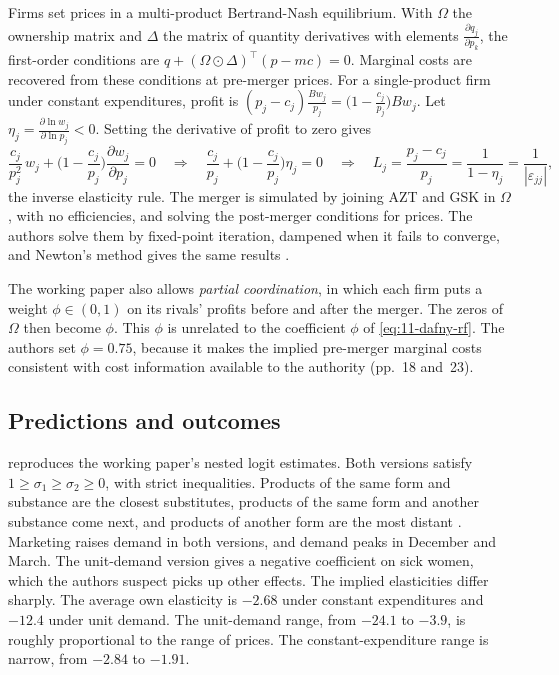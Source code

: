  Firms set prices in a multi-product Bertrand-Nash equilibrium. With $\Omega$ the
ownership matrix and $\Delta$ the matrix of quantity derivatives with elements $\frac{\partial q_j}{\partial p_k}$,
the first-order conditions are $q+(\Omega\odot\Delta)^{\top}(p-mc)=0$. Marginal costs are recovered from these
conditions at pre-merger prices. For a single-product firm under constant expenditures, profit is
$(p_j-c_j)\frac{Bw_j}{p_j}=\big(1-\frac{c_j}{p_j}\big)Bw_j$. Let $\eta_j=\frac{\partial\ln w_j}{\partial\ln
p_j}<0$. Setting the derivative of profit to zero gives
\begin{equation*}
\frac{c_j}{p_j^2}\,w_j+\Big(1-\frac{c_j}{p_j}\Big)\frac{\partial w_j}{\partial p_j}=0
\quad\Longrightarrow\quad
\frac{c_j}{p_j}+\Big(1-\frac{c_j}{p_j}\Big)\eta_j=0
\quad\Longrightarrow\quad
L_j=\frac{p_j-c_j}{p_j}=\frac{1}{1-\eta_j}=\frac{1}{|\varepsilon_{jj}|},
\end{equation*}
the inverse elasticity rule. The merger is simulated by joining AZT and GSK in $\Omega$, with no efficiencies, and
solving the post-merger conditions for prices. The authors solve them by fixed-point iteration, dampened when it
fails to converge, and Newton's method gives the same results \citep[p.~18]{BjornerstedtVerboven2013}.

The working paper also allows \emph{partial coordination}, in which each firm puts a weight $\phi\in(0,1)$ on its
rivals' profits before and after the merger. The zeros of $\Omega$ then become $\phi$. This $\phi$ is unrelated to
the coefficient $\phi$ of \eqref{eq:11-dafny-rf}. The authors set $\phi=0.75$, because it makes the implied
pre-merger marginal costs consistent with cost information available to the authority (pp.~18 and~23).

\subsection{Predictions and outcomes}\label{sec:11-bv-results}

  reproduces the working paper's nested logit estimates. Both
versions satisfy $1\ge\sigma_1\ge\sigma_2\ge0$, with strict inequalities. Products of the same form and substance are
the closest substitutes, products of the same form and another substance come next, and products of another form are
the most distant \citep[p.~21]{BjornerstedtVerboven2013}. Marketing raises demand in both versions, and demand peaks
in December and March. The unit-demand version gives a negative coefficient on sick women, which the authors suspect
picks up other effects. The implied elasticities differ sharply. The average own elasticity is $-2.68$ under
constant expenditures and $-12.4$ under unit demand. The unit-demand range, from $-24.1$ to $-3.9$, is roughly
proportional to the range of prices. The constant-expenditure range is narrow, from $-2.84$ to $-1.91$.

